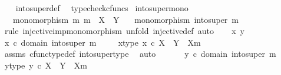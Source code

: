 \begin{isabellebody}
%
\isadelimproof
\ \ %
\endisadelimproof
%
\isatagproof
{}\isamarkupfalse%
\ into{\isacharunderscore}{\kern0pt}super{\isacharunderscore}{\kern0pt}def\ \isamarkupfalse%
\ typecheck{\isacharunderscore}{\kern0pt}cfuncs%
\endisatagproof
{\isafoldproof}%
%
\isadelimproof
\isanewline
%
\endisadelimproof
\isanewline
{}\isamarkupfalse%
\ into{\isacharunderscore}{\kern0pt}super{\isacharunderscore}{\kern0pt}mono{\isacharcolon}{\kern0pt}\isanewline
\ \ \ {\isachardoublequoteopen}monomorphism\ m{\isachardoublequoteclose}\ {\isachardoublequoteopen}m\ {\isacharcolon}{\kern0pt}\ X\ {\isasymrightarrow}\ Y{\isachardoublequoteclose}\isanewline
\ \ \ {\isachardoublequoteopen}monomorphism\ {\isacharparenleft}{\kern0pt}into{\isacharunderscore}{\kern0pt}super\ m{\isacharparenright}{\kern0pt}{\isachardoublequoteclose}\isanewline
%
\isadelimproof
%
\endisadelimproof
%
\isatagproof
{}\isamarkupfalse%
\ {\isacharparenleft}{\kern0pt}rule\ injective{\isacharunderscore}{\kern0pt}imp{\isacharunderscore}{\kern0pt}monomorphism{\isacharcomma}{\kern0pt}\ unfold\ injective{\isacharunderscore}{\kern0pt}def{\isacharcomma}{\kern0pt}\ auto{\isacharparenright}{\kern0pt}\isanewline
\ \ \isamarkupfalse%
\ x\ y\isanewline
\ \ \isamarkupfalse%
\ {\isachardoublequoteopen}x\ {\isasymin}\isactrlsub c\ domain\ {\isacharparenleft}{\kern0pt}into{\isacharunderscore}{\kern0pt}super\ m{\isacharparenright}{\kern0pt}{\isachardoublequoteclose}\ \ \isamarkupfalse%
\ \isamarkupfalse%
\ x{\isacharunderscore}{\kern0pt}type{\isacharcolon}{\kern0pt}\ {\isachardoublequoteopen}x\ {\isasymin}\isactrlsub c\ X\ {\isasymCoprod}\ {\isacharparenleft}{\kern0pt}Y\ {\isasymsetminus}\ {\isacharparenleft}{\kern0pt}X{\isacharcomma}{\kern0pt}m{\isacharparenright}{\kern0pt}{\isacharparenright}{\kern0pt}{\isachardoublequoteclose}\isanewline
\ \ \ \ \isamarkupfalse%
\ assms\ cfunc{\isacharunderscore}{\kern0pt}type{\isacharunderscore}{\kern0pt}def\ into{\isacharunderscore}{\kern0pt}super{\isacharunderscore}{\kern0pt}type\ \isamarkupfalse%
\ auto\isanewline
\ \ \isanewline
\ \ \isamarkupfalse%
\ {\isachardoublequoteopen}y\ {\isasymin}\isactrlsub c\ domain\ {\isacharparenleft}{\kern0pt}into{\isacharunderscore}{\kern0pt}super\ m{\isacharparenright}{\kern0pt}{\isachardoublequoteclose}\ \ \isamarkupfalse%
\ \isamarkupfalse%
\ y{\isacharunderscore}{\kern0pt}type{\isacharcolon}{\kern0pt}\ {\isachardoublequoteopen}y\ {\isasymin}\isactrlsub c\ X\ {\isasymCoprod}\ {\isacharparenleft}{\kern0pt}Y\ {\isasymsetminus}\ {\isacharparenleft}{\kern0pt}X{\isacharcomma}{\kern0pt}m{\isacharparenright}{\kern0pt}{\isacharparenright}{\kern0pt}{\isachardoublequoteclose}\isanewline

\end{isabellebody}
